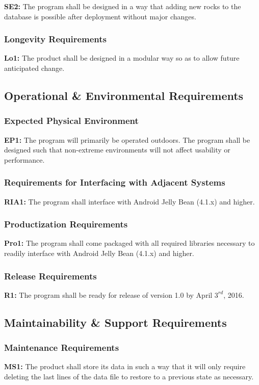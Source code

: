 \documentclass[titlepage]{article}
\begin{document}
\noindent\textbf{SE2:} The program shall be designed in a way that adding new rocks to the database is possible after deployment without major changes.
\subsubsection{Longevity Requirements}
\textbf{Lo1:} The product shall be designed in a modular way so as to allow future anticipated change.

\subsection{Operational \& Environmental Requirements}
\subsubsection{Expected Physical Environment}
\textbf{EP1:} The program will primarily be operated outdoors. The program shall be designed such that non-extreme environments will not affect usability or performance.
\subsubsection{Requirements for Interfacing with Adjacent Systems}
\textbf{RIA1:} The program shall interface with Android Jelly Bean (4.1.x) and higher.
\subsubsection{Productization Requirements}
\textbf{Pro1:} The program shall come packaged with all required libraries necessary to readily interface with Android Jelly Bean (4.1.x) and higher.
\subsubsection{Release Requirements}
\textbf{R1:} The program shall be ready for release of version 1.0 by April $3^{rd}$, 2016.

\subsection{Maintainability \& Support Requirements}
\subsubsection{Maintenance Requirements}
\textbf{MS1:} The product shall store its data in such a way that it will only require deleting the last lines of the data file to restore to a previous state as necessary.
\end{document}
